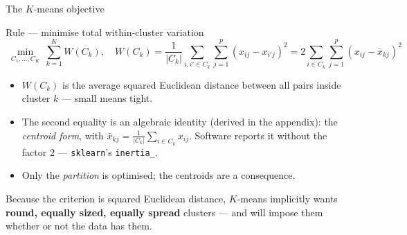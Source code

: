 \documentclass[aspectratio=169,11pt]{beamer}
\begin{document}
\begin{frame}{The $K$-means objective}
  \scriptsize
  \begin{block}{Rule --- minimise total within-cluster variation}
    \[
      \boxed{\;\min_{C_1,\dots,C_K}\ \sum_{k=1}^{K} W(C_k),
      \quad W(C_k)=\frac{1}{|C_k|}\sum_{i,i'\in C_k}\sum_{j=1}^{p}(x_{ij}-x_{i'j})^{2}
      = 2\sum_{i\in C_k}\sum_{j=1}^{p}(x_{ij}-\bar x_{kj})^{2} \;}
    \]
  \end{block}
  \begin{readme}
    \begin{itemize}
      \item $W(C_k)$ is the average squared Euclidean distance between all pairs inside
            cluster $k$ --- small means tight.
      \item The second equality is an algebraic identity (derived in the appendix): the
            \emph{centroid form}, with $\bar x_{kj}=\frac{1}{|C_k|}\sum_{i\in C_k}x_{ij}$.
            Software reports it without the factor $2$ --- \texttt{sklearn}'s
            \texttt{inertia\_}.
      \item Only the \emph{partition} is optimised; the centroids are a consequence.
    \end{itemize}
  \end{readme}
  \begin{takeaway}
    Because the criterion is squared Euclidean distance, $K$-means implicitly wants
    \textbf{round, equally sized, equally spread} clusters --- and will impose them
    whether or not the data has them.
  \end{takeaway}
\end{frame}
\end{document}
